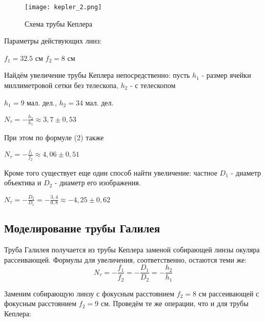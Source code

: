 \begin{figure}[h!]
        \centering
            \texttt{[image: kepler\_2.png]}
            \caption{Схема трубы Кеплера}
        \label{img::3_3}
\end{figure}

Параметры действующих линз:

\begin{center}
    $f_{1} = 32.5$ см \hspace{1cm} $f_2 = 8$ см
\end{center}

Найдём увеличение трубы Кеплера непосредственно: пусть $h_1$ - размер ячейки миллиметровой сетки без телескопа, $h_2$ - с телескопом

\begin{center}
	$h_1 = 9$ мал. дел., \hspace{1cm} $h_2 = 34$ мал. дел. \par

	$N_{\tau} = -\frac{h_2}{h_1} \approx 3,7 \pm 0,53$
\end{center}

При этом по формуле (2) также

\begin{center}
    $N_{\tau} = -\frac{f_{1}}{f_2} \approx 4,06 \pm 0,51$
\end{center}

Кроме того существует еще один способ найти увеличение: частное $D_1 $ - диаметр объектива и $D_2$ - диаметр его изображения.

\begin{center}
	$N_{\tau} = -\frac{D_2}{D_1} = -\frac{3,4}{0,8} \approx -4,25 \pm 0,62$
\end{center}


\newpage
\subsection{Моделирование трубы Галилея}

Труба Галилея получается из трубы Кеплера заменой собирающей линзы окуляра рассеивающей. Формулы для увеличения, соответственно, остаются теми же:
\begin{equation}
    N_{\tau} = -\frac{f_1}{f_2} = -\frac{D_1}{D_2} =  -\frac{h_2}{h_1}
\end{equation}


Заменим собирающую линзу с фокусным расстоянием $f_2 = 8$ см рассеивающей с фокусным расстоянием $f_2 = 9$ см. Проведём те же операции, что и для трубы Кеплера:

